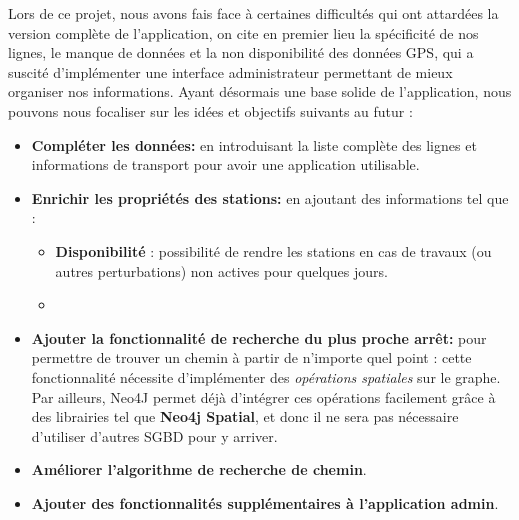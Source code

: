 Lors de ce projet, nous avons fais face à certaines difficultés qui ont attardées la version complète de l'application, on cite en premier lieu la spécificité de nos lignes, le manque de données et la non disponibilité des données GPS, qui a suscité d'implémenter une interface administrateur permettant de mieux organiser nos informations.\newline\newline
Ayant désormais une base solide de l'application, nous pouvons nous focaliser sur les idées et objectifs suivants au futur :
\begin{itemize}
	\item \textbf{Compléter les données:} en introduisant la liste complète des lignes et informations de transport pour avoir une application utilisable.
	
	\item \textbf{Enrichir les propriétés des stations: }en ajoutant des informations tel que :\newline
		\begin{itemize}
			\item \textbf{Disponibilité }: possibilité de rendre les stations en cas de travaux (ou autres perturbations) non actives pour quelques jours.
			\item
		\end{itemize}
		
	\item \textbf{Ajouter la fonctionnalité de recherche du plus proche arrêt: } pour permettre de trouver un chemin à partir de n'importe quel point : cette fonctionnalité nécessite d'implémenter des \emph{opérations spatiales} sur le graphe. Par ailleurs, Neo4J permet déjà d'intégrer ces opérations facilement grâce à des librairies tel que \textbf{Neo4j Spatial}, et donc il ne sera pas nécessaire d'utiliser d'autres SGBD pour y arriver.

	\item \textbf{Améliorer l'algorithme de recherche de chemin}.
	
	\item \textbf{Ajouter des fonctionnalités supplémentaires à l'application admin}.
	

\end{itemize}

